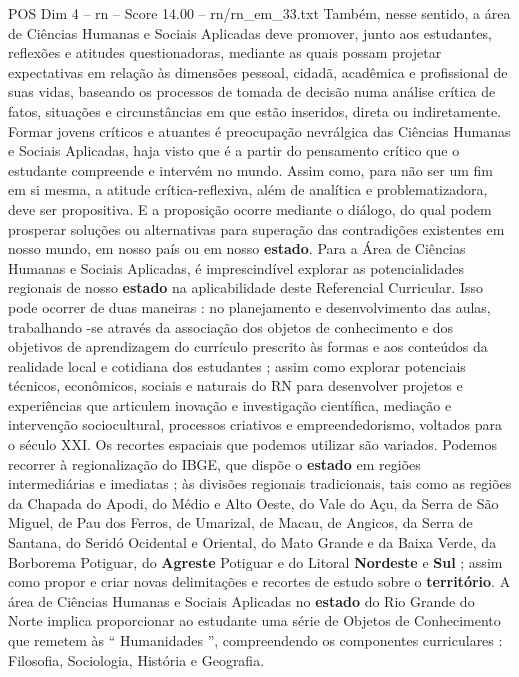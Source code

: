 \begin{textsample}{POS Dim 4 – rn – Score 14.00 – rn/rn\_em\_33.txt}
Também, nesse sentido, a área de Ciências Humanas e Sociais Aplicadas deve promover, junto aos estudantes, reflexões e atitudes questionadoras, mediante as quais possam projetar expectativas em relação às dimensões pessoal, cidadã, acadêmica e profissional de suas vidas, baseando os processos de tomada de decisão numa análise crítica de fatos, situações e circunstâncias em que estão inseridos, direta ou indiretamente.
Formar jovens críticos e atuantes é preocupação nevrálgica das Ciências Humanas e Sociais Aplicadas, haja visto que é a partir do pensamento crítico que o estudante compreende e intervém no mundo.
Assim como, para não ser um fim em si mesma, a atitude crítica-reflexiva, além de analítica e problematizadora, deve ser propositiva.
E a proposição ocorre mediante o diálogo, do qual podem prosperar soluções ou alternativas para superação das contradições existentes em nosso mundo, em nosso país ou em nosso \textbf{estado}.
Para a Área de Ciências Humanas e Sociais Aplicadas, é imprescindível explorar as potencialidades regionais de nosso \textbf{estado} na aplicabilidade deste Referencial Curricular.
Isso pode ocorrer de duas maneiras : no planejamento e desenvolvimento das aulas, trabalhando -se através da associação dos objetos de conhecimento e dos objetivos de aprendizagem do currículo prescrito às formas e aos conteúdos da realidade local e cotidiana dos estudantes ; assim como explorar potenciais técnicos, econômicos, sociais e naturais do RN para desenvolver projetos e experiências que articulem inovação e investigação científica, mediação e intervenção sociocultural, processos criativos e empreendedorismo, voltados para o século XXI.
Os recortes espaciais que podemos utilizar são variados.
Podemos recorrer à regionalização do IBGE, que dispõe o \textbf{estado} em regiões intermediárias e imediatas ; às divisões regionais tradicionais, tais como as regiões da Chapada do Apodi, do Médio e Alto Oeste, do Vale do Açu, da Serra de São Miguel, de Pau dos Ferros, de Umarizal, de Macau, de Angicos, da Serra de Santana, do Seridó Ocidental e Oriental, do Mato Grande e da Baixa Verde, da Borborema Potiguar, do \textbf{Agreste} Potiguar e do Litoral \textbf{Nordeste} e \textbf{Sul} ; assim como propor e criar novas delimitações e recortes de estudo sobre o \textbf{território}.
A área de Ciências Humanas e Sociais Aplicadas no \textbf{estado} do Rio Grande do Norte implica proporcionar ao estudante uma série de Objetos de Conhecimento que remetem às “ Humanidades ”, compreendendo os componentes curriculares : Filosofia, Sociologia, História e Geografia.

\end{textsample}
